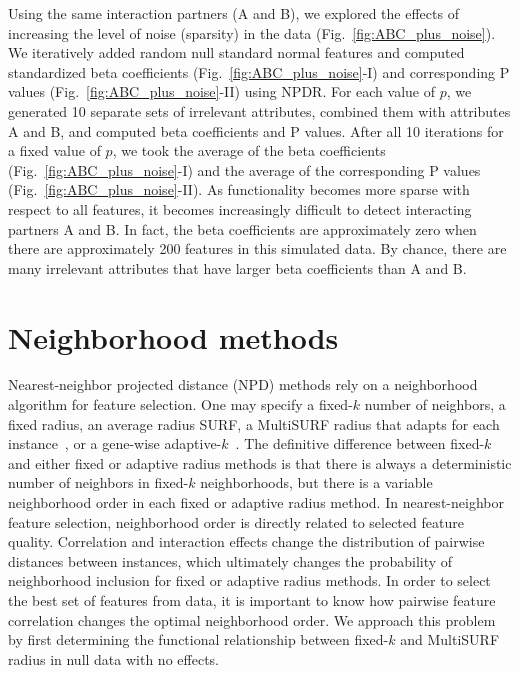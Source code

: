\documentclass[10pt,letterpaper]{article}\usepackage[]{graphicx}\usepackage[]{color}
\begin{document}
Using the same interaction partners (A and B), we explored the effects of increasing the level of noise (sparsity) in the data (Fig.~\ref{fig:ABC_plus_noise}). We iteratively added random null standard normal features and computed standardized beta coefficients (Fig.~\ref{fig:ABC_plus_noise}-I) and corresponding P values (Fig.~\ref{fig:ABC_plus_noise}-II) using NPDR. For each value of $p$, we generated 10 separate sets of irrelevant attributes, combined them with attributes A and B, and computed beta coefficients and P values. After all 10 iterations for a fixed value of $p$, we took the average of the beta coefficients (Fig.~\ref{fig:ABC_plus_noise}-I) and the average of the corresponding P values (Fig.~\ref{fig:ABC_plus_noise}-II). As functionality becomes more sparse with respect to all features, it becomes increasingly difficult to detect interacting partners A and B. In fact, the beta coefficients are approximately zero when there are approximately 200 features in this simulated data. By chance, there are many irrelevant attributes that have larger beta coefficients than A and B. 

\section{Neighborhood methods}
Nearest-neighbor projected distance (NPD) methods rely on a neighborhood algorithm for feature selection. One may specify a fixed-$k$ number of neighbors, a fixed radius, an average radius SURF, a MultiSURF radius that adapts for each instance~\cite{urbanowicz17}, or a gene-wise adaptive-$k$~\cite{mckinney13}. The definitive difference between fixed-$k$ and either fixed or adaptive radius methods is that there is always a deterministic number of neighbors in fixed-$k$ neighborhoods, but there is a variable neighborhood order in each fixed or adaptive radius method. In nearest-neighbor feature selection, neighborhood order is directly related to selected feature quality. Correlation and interaction effects change the distribution of pairwise distances between instances, which ultimately changes the probability of neighborhood inclusion for fixed or adaptive radius methods. In order to select the best set of features from data, it is important to know how pairwise feature correlation changes the optimal neighborhood order. We approach this problem by first determining the functional relationship between fixed-$k$ and MultiSURF radius in null data with no effects.
\end{document}
